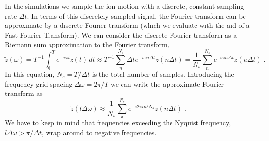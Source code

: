 \documentclass[aps, pra, preprint]{revtex4-1}
\begin{document}
In the simulations we sample the ion motion with a discrete,
constant sampling rate $\Delta t$. In terms of this discretely
sampled signal, the Fourier transform can be approximate by a
discrete Fourier transform (which we evaluate with the aid of a
Fast Fourier Transform). We can consider the discrete Fourier
transform as a Riemann sum approximation to the Fourier
transform,
\begin{equation}
  \tilde{z}(\omega)=
  T^{-1}\int_0^Te^{-i\omega t}z(t)\,dt \approx
  T^{-1}\sum_n^{N_s}\Delta t e^{-i\omega n\Delta t}z(n \Delta t) =
  \frac{1}{N_s}\sum_n^{N_s}e^{-i\omega n\Delta t}z(n \Delta t)\;.
\end{equation}
In this equation, $N_s = T / \Delta t$ is the total number of
samples. Introducing the frequency grid spacing
$\Delta\omega=2\pi/T$ we can write the approximate Fourier
transform as
\begin{equation}
  \tilde{z}(l\Delta\omega)\approx
  \frac{1}{N_s}\sum_n^{N_s}e^{-i2\pi ln/N_s}z(n \Delta t)\;.
\end{equation}
We have to keep in mind that frequencies exceeding the Nyquist
frequency, $l\Delta\omega>\pi/\Delta t$, wrap around to negative
frequencies.
\end{document}

